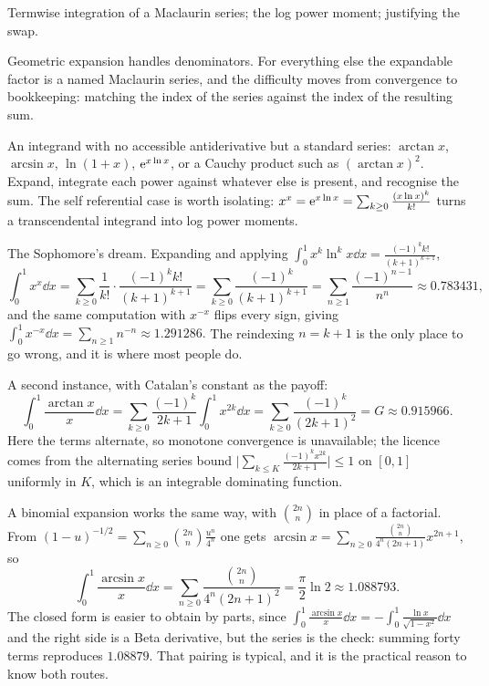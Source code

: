 \begin{seealsob}Termwise integration of a Maclaurin series; the log power moment; justifying the swap.\end{seealsob}

Geometric expansion handles denominators. For everything else the expandable factor is a named Maclaurin series, and the difficulty moves from convergence to bookkeeping: matching the index of the series against the index of the resulting sum.

\cue An integrand with no accessible antiderivative but a standard series: $\arctan x$, $\arcsin x$, $\ln(1+x)$, $\mathrm{e}^{x\ln x}$, or a Cauchy product such as $(\arctan x)^{2}$.
\method Expand, integrate each power against whatever else is present, and recognise the sum. The self referential case is worth isolating: $x^{x}=\mathrm{e}^{x\ln x}=\sum_{k\geq0}\frac{(x\ln x)^{k}}{k!}$ turns a transcendental integrand into log power moments.

\begin{worked}
The Sophomore's dream. Expanding and applying $\int_0^1x^{k}\ln^{k}x\dd x=\frac{(-1)^{k}k!}{(k+1)^{k+1}}$,
\[\int_0^1x^{x}\dd x=\sum_{k\geq0}\frac{1}{k!}\cdot\frac{(-1)^{k}k!}{(k+1)^{k+1}}=\sum_{k\geq0}\frac{(-1)^{k}}{(k+1)^{k+1}}=\sum_{n\geq1}\frac{(-1)^{n-1}}{n^{n}}\approx0.783431,\]
and the same computation with $x^{-x}$ flips every sign, giving $\int_0^1x^{-x}\dd x=\sum_{n\geq1}n^{-n}\approx1.291286. $ The reindexing $n=k+1$ is the only place to go wrong, and it is where most people do.

A second instance, with Catalan's constant as the payoff:
\[\int_0^1\frac{\arctan x}{x}\dd x=\sum_{k\geq0}\frac{(-1)^{k}}{2k+1}\int_0^1x^{2k}\dd x=\sum_{k\geq0}\frac{(-1)^{k}}{(2k+1)^{2}}=G\approx0.915966.\]
Here the terms alternate, so monotone convergence is unavailable; the licence comes from the alternating series bound $\bigl\lvert\sum_{k\leq K}\frac{(-1)^{k}x^{2k}}{2k+1}\bigr\rvert\leq1$ on $[0,1]$ uniformly in $K$, which is an integrable dominating function.

A binomial expansion works the same way, with $\binom{2n}{n}$ in place of a factorial. From $(1-u)^{-1/2}=\sum_{n\geq0}\binom{2n}{n}\frac{u^{n}}{4^{n}}$ one gets $\arcsin x=\sum_{n\geq0}\frac{\binom{2n}{n}}{4^{n}(2n+1)}x^{2n+1}$, so
\[\int_0^1\frac{\arcsin x}{x}\dd x=\sum_{n\geq0}\frac{\binom{2n}{n}}{4^{n}(2n+1)^{2}}=\frac{\pi}{2}\ln2\approx1.088793.\]
The closed form is easier to obtain by parts, since $\int_0^1\frac{\arcsin x}{x}\dd x=-\int_0^1\frac{\ln x}{\sqrt{1-x^{2}}}\dd x$ and the right side is a Beta derivative, but the series is the check: summing forty terms reproduces $1.08879$. That pairing is typical, and it is the practical reason to know both routes.
\end{worked}

